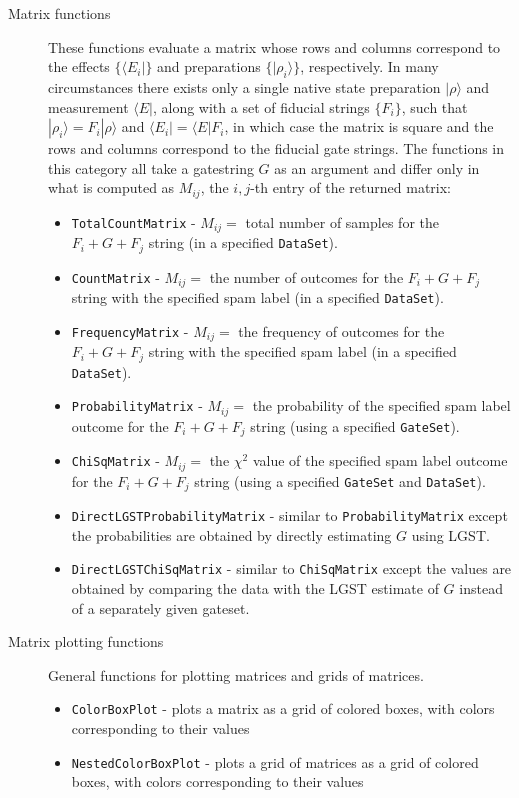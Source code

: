 \documentclass{article}[11pt]
\begin{document}
\begin{description}
\item[Matrix functions] These functions evaluate a matrix whose rows and columns correspond to the effects $\{\langle E_i|\}$ and preparations $\{|\rho_i\rangle\}$, respectively.  In many circumstances there exists only a single native state preparation $|\rho\rangle$ and measurement $\langle E|$, along with a set of fiducial strings $\{F_i\}$, such that $|\rho_i\rangle = F_i|\rho\rangle$ and $\langle E_i| = \langle E|F_i$, in which case the matrix is square and the rows and columns correspond to the fiducial gate strings.  The functions in this category all take a gatestring $G$ as an argument and differ only in what is computed as $M_{ij}$, the $i,j$-th entry of the returned matrix:
  \begin{itemize}
    \item \texttt{TotalCountMatrix} - $M_{ij} = $ total number of samples for the $F_i + G + F_j$ string (in a specified \texttt{DataSet}).
    \item \texttt{CountMatrix} - $M_{ij} = $ the number of outcomes for the $F_i + G + F_j$ string with the specified spam label (in a specified \texttt{DataSet}).
    \item \texttt{FrequencyMatrix} - $M_{ij} = $ the frequency of outcomes for the $F_i + G + F_j$ string with the specified spam label (in a specified \texttt{DataSet}).
    \item \texttt{ProbabilityMatrix} - $M_{ij} = $ the probability of the specified spam label outcome for the $F_i + G + F_j$ string (using a specified \texttt{GateSet}).
    \item \texttt{ChiSqMatrix} - $M_{ij} = $ the $\chi^2$ value of the specified spam label outcome for the $F_i + G + F_j$ string (using a specified \texttt{GateSet} and \texttt{DataSet}).
    \item \texttt{DirectLGSTProbabilityMatrix} - similar to \texttt{ProbabilityMatrix} except the probabilities are obtained by directly estimating $G$ using LGST.
    \item \texttt{DirectLGSTChiSqMatrix} - similar to \texttt{ChiSqMatrix} except the values are obtained by comparing the data with the LGST estimate of $G$ instead of a separately given gateset.
   \end{itemize}

\item[Matrix plotting functions]  General functions for plotting matrices and grids of matrices.
  \begin{itemize}
    \item \texttt{ColorBoxPlot} - plots a matrix as a grid of colored boxes, with colors corresponding to their values
    \item \texttt{NestedColorBoxPlot} - plots a grid of matrices as a grid of colored boxes, with colors corresponding to their values
  \end{itemize}


\end{description}
\end{document}
